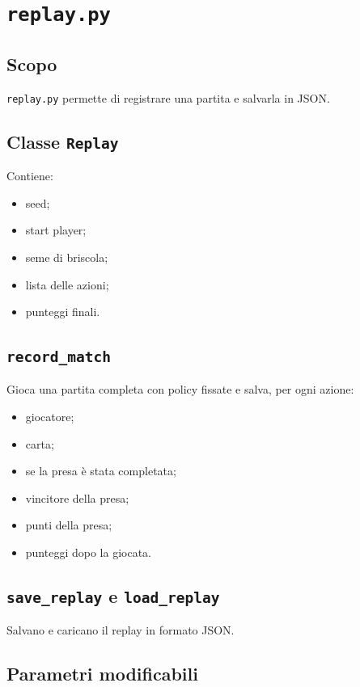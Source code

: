 \documentclass[11pt,a4paper]{article}
\begin{document}
\section{\texttt{replay.py}}

\subsection{Scopo}

\texttt{replay.py} permette di registrare una partita e salvarla in JSON.

\subsection{Classe \texttt{Replay}}

Contiene:

\begin{itemize}
  \item seed;
  \item start player;
  \item seme di briscola;
  \item lista delle azioni;
  \item punteggi finali.
\end{itemize}

\subsection{\texttt{record\_match}}

Gioca una partita completa con policy fissate e salva, per ogni azione:

\begin{itemize}
  \item giocatore;
  \item carta;
  \item se la presa è stata completata;
  \item vincitore della presa;
  \item punti della presa;
  \item punteggi dopo la giocata.
\end{itemize}

\subsection{\texttt{save\_replay} e \texttt{load\_replay}}

Salvano e caricano il replay in formato JSON.

\subsection{Parametri modificabili}
\end{document}
